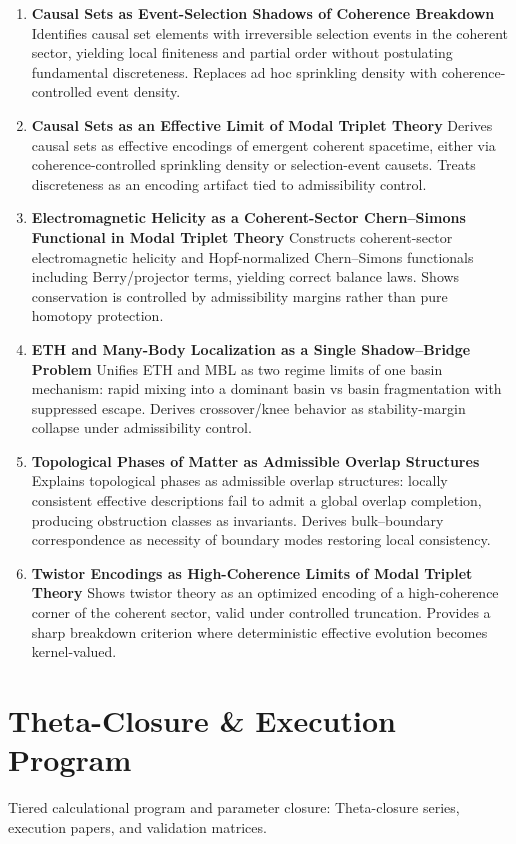\documentclass[11pt]{article}
\begin{document}
\begin{enumerate}[leftmargin=*]
\item \textbf{Causal Sets as Event-Selection Shadows of Coherence Breakdown} Identifies causal set elements with irreversible selection events in the coherent sector, yielding local finiteness and partial order without postulating fundamental discreteness. Replaces ad hoc sprinkling density with coherence-controlled event density.
\item \textbf{Causal Sets as an Effective Limit of Modal Triplet Theory} Derives causal sets as effective encodings of emergent coherent spacetime, either via coherence-controlled sprinkling density or selection-event causets. Treats discreteness as an encoding artifact tied to admissibility control.
\item \textbf{Electromagnetic Helicity as a Coherent-Sector Chern–Simons Functional in Modal Triplet Theory} Constructs coherent-sector electromagnetic helicity and Hopf-normalized Chern–Simons functionals including Berry/projector terms, yielding correct balance laws. Shows conservation is controlled by admissibility margins rather than pure homotopy protection.
\item \textbf{ETH and Many-Body Localization as a Single Shadow–Bridge Problem} Unifies ETH and MBL as two regime limits of one basin mechanism: rapid mixing into a dominant basin vs basin fragmentation with suppressed escape. Derives crossover/knee behavior as stability-margin collapse under admissibility control.
\item \textbf{Topological Phases of Matter as Admissible Overlap Structures} Explains topological phases as admissible overlap structures: locally consistent effective descriptions fail to admit a global overlap completion, producing obstruction classes as invariants. Derives bulk–boundary correspondence as necessity of boundary modes restoring local consistency.
\item \textbf{Twistor Encodings as High-Coherence Limits of Modal Triplet Theory} Shows twistor theory as an optimized encoding of a high-coherence corner of the coherent sector, valid under controlled truncation. Provides a sharp breakdown criterion where deterministic effective evolution becomes kernel-valued.


\end{enumerate}

\section{Theta-Closure \& Execution Program}
Tiered calculational program and parameter closure: Theta-closure series, execution papers, and validation matrices.
\end{document}
